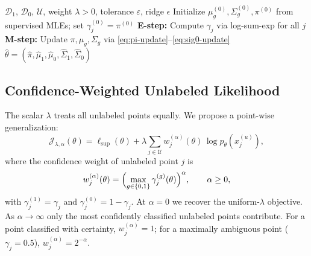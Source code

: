 \documentclass[11pt]{article}
\theoremstyle{definition}
\newcommand{\calD}{\mathcal{D}}
\newcommand{\calU}{\mathcal{U}}
\newcommand{\calJ}{\mathcal{J}}
\newcommand{\lam}{\lambda}
\newcommand{\Sig}{\Sigma}
\begin{document}
\begin{algorithm}[t]
\caption{Weighted Semi-Supervised EM}
\label{alg:ssem}
\begin{algorithmic}[1]
\Require $\calD_1$, $\calD_0$, $\calU$, weight $\lam>0$, tolerance $\varepsilon$, ridge $\epsilon$
\State Initialize $\mu_g^{(0)},\Sig_g^{(0)},\pi^{(0)}$ from supervised MLEs;
       set $\gamma_j^{(0)} = \pi^{(0)}$
\Repeat
  \State \textbf{E-step:} Compute $\gamma_j$ via log-sum-exp for all $j$
  \State \textbf{M-step:} Update $\pi,\mu_g,\Sig_g$ via
         \eqref{eq:pi-update}--\eqref{eq:sig0-update}
\Return $\hat\theta = (\hat\pi, \hat\mu_1, \hat\mu_0, \hat\Sig_1, \hat\Sig_0)$
\end{algorithmic}
\end{algorithm}

\subsection{Confidence-Weighted Unlabeled Likelihood}
\label{sec:conf-weighted}

The scalar \(\lam\) treats all unlabeled points equally.
We propose a point-wise generalization:
\begin{equation}
\calJ_{\lam,\alpha}(\theta)
= \ell_{\mathrm{sup}}(\theta)
  + \lam\sum_{j\in\calU}
    w_j^{(\alpha)}(\theta)\,
    \log p_\theta(x_j^{(u)}),
\label{eq:conf-objective}
\end{equation}
where the confidence weight of unlabeled point \(j\) is
\begin{equation}
w_j^{(\alpha)}(\theta)
= \Bigl(\max_{g\in\{0,1\}}\gamma_j^{(g)}(\theta)\Bigr)^\alpha,
\qquad \alpha\geq 0,
\label{eq:conf-weight}
\end{equation}
with \(\gamma_j^{(1)}=\gamma_j\) and \(\gamma_j^{(0)}=1-\gamma_j\).
At \(\alpha=0\) we recover the uniform-\(\lam\) objective.
As \(\alpha\to\infty\) only the most confidently classified unlabeled points contribute.
For a point classified with certainty, \(w_j^{(\alpha)}=1\); for a
maximally ambiguous point (\(\gamma_j=0.5\)), \(w_j^{(\alpha)}=2^{-\alpha}\).
\end{document}
